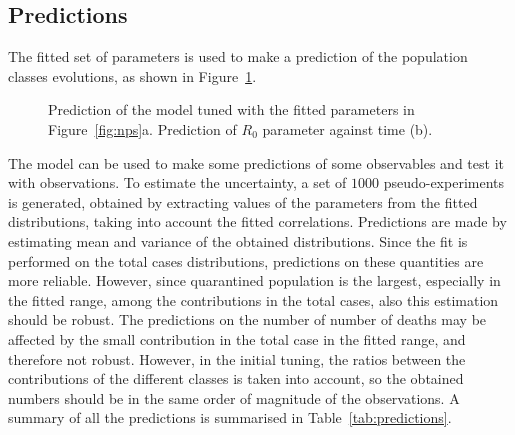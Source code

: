 \subsection{Predictions}
The fitted set of parameters is used to make a prediction of the population classes evolutions, as shown in Figure~\ref{fig:model_postfit}.

\begin{figure}
\centering
{}
  \caption{Prediction of the model tuned with the fitted parameters in Figure~\ref{fig:nps}a. Prediction of $R_0$ parameter against time (b).}
  \label{fig:model_postfit}
\end{figure}

The model can be used to make some predictions of some observables and test it with observations. To estimate the uncertainty, a set of $1000$ pseudo-experiments is generated, obtained by extracting values of the parameters from the fitted distributions, taking into account the fitted correlations. Predictions are made by estimating mean and variance of the obtained distributions. Since the fit is performed on the total cases distributions, predictions on these quantities are more reliable. However, since quarantined population is the largest, especially in the fitted range, among the contributions in the total cases, also this estimation should be robust. The predictions on the number of number of deaths may be affected by the small contribution in the total case in the fitted range, and therefore not robust. However, in the initial tuning, the ratios between the contributions of the different classes is taken into account, so the obtained numbers should be in the same order of magnitude of the observations. A summary of all the predictions is summarised in Table~\ref{tab:predictions}.


